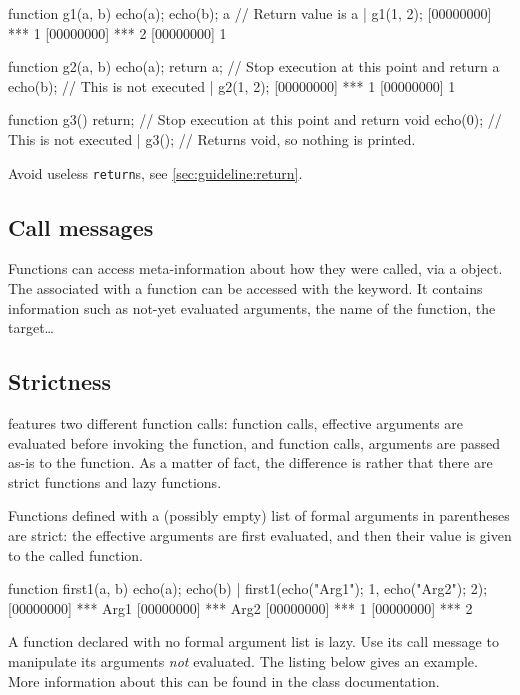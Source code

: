 \begin{urbiscript}
function g1(a, b)
{
  echo(a);
  echo(b);
  a // Return value is a
}|
g1(1, 2);
[00000000] *** 1
[00000000] *** 2
[00000000] 1

function g2(a, b)
{
  echo(a);
  return a; // Stop execution at this point and return a
  echo(b); // This is not executed
}|
g2(1, 2);
[00000000] *** 1
[00000000] 1

function g3()
{
  return; // Stop execution at this point and return void
  echo(0); // This is not executed
}|
g3(); // Returns void, so nothing is printed.
\end{urbiscript}

Avoid useless \lstinline{return}s, see \autoref{sec:guideline:return}.

\subsection{Call messages}
\label{sec:lang:call}

Functions can access meta-information about how they were called, via a
 object. The  associated with a
function can be accessed with the  keyword.  It contains
information such as not-yet evaluated arguments, the name of the function,
the target\ldots

\subsection{Strictness}

\us features two different function calls: 
function calls, effective arguments are evaluated before invoking the
function, and  function calls, arguments are passed
as-is to the function.  As a matter of fact, the difference is rather that
there are strict functions and lazy functions.

Functions defined with a (possibly empty) list of formal arguments in
parentheses are strict: the effective arguments are first evaluated,
and then their value is given to the called function.

\begin{urbiscript}
function first1(a, b) {
  echo(a); echo(b)
}|
first1({echo("Arg1"); 1},
       {echo("Arg2"); 2});
[00000000] *** Arg1
[00000000] *** Arg2
[00000000] *** 1
[00000000] *** 2
\end{urbiscript}

A function declared with no formal argument list is lazy.  Use its call
message to manipulate its arguments \emph{not} evaluated.  The listing below
gives an example.  More information about this can be found in the
 class documentation.

